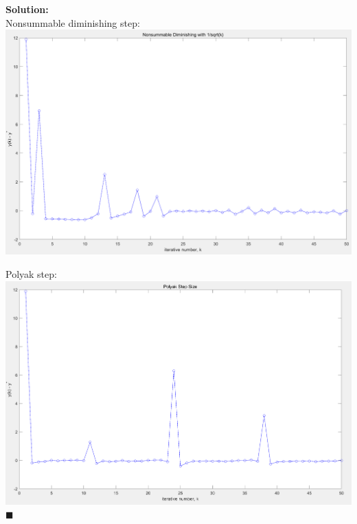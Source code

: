 \documentclass{article}
\newenvironment{solution}                               %
{\textbf{Solution:} \\}{$\blacksquare$\newline}         %
\begin{document}
\begin{solution}
    Nonsummable diminishing step: \\
    \includegraphics[width=1.0\textwidth]{img/a3+6(3).png}

    Polyak step: \\
    \includegraphics[width=1.0\textwidth]{img/a3+6(4).png}
\end{solution}
\end{document}
